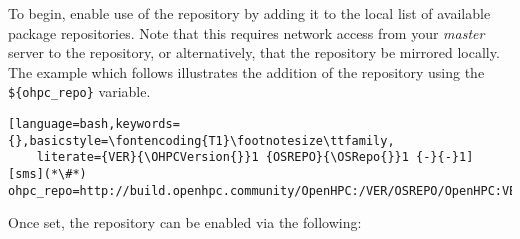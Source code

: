 To begin, enable use of the \OHPC{} repository by adding it to the local list
of available package repositories. Note that this requires network access from
your {\em master} server to the \OHPC{} repository, or alternatively, that
the \OHPC{} repository be mirrored locally. The example which follows
illustrates the addition of the \OHPC{} repository using
the \texttt{\$\{ohpc\_repo\}} variable.

\begin{lstlisting}[language=bash,keywords={},basicstyle=\fontencoding{T1}\footnotesize\ttfamily,
	literate={VER}{\OHPCVersion{}}1 {OSREPO}{\OSRepo{}}1 {-}{-}1]
[sms](*\#*) ohpc_repo=http://build.openhpc.community/OpenHPC:/VER/OSREPO/OpenHPC:VER.repo
\end{lstlisting}

\noindent Once set, the repository can be enabled via the following: 






